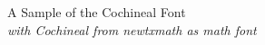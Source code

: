 \documentclass[11pt]{article}
\begin{document}
{\LARGE \noindent A Sample of the Cochineal Font}\\

{\large \noindent \textit{with Cochineal from newtxmath as math font}}\\[5pt]


\end{document}
